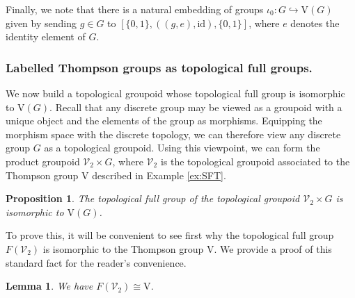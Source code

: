 \documentclass[10pt,a4paper]{amsart}
\numberwithin{equation}{section}
\numberwithin{figure}{section}
\newtheorem{lem}[thm]{Lemma}
\newtheorem{prop}[thm]{Proposition}
\theoremstyle{definition}
\newcommand{\cV}{\mathcal{V}}
\newcommand{\V}{\mathrm{V}}
\begin{document}
Finally, we note that there is a natural embedding of groups $\iota_0 \colon G \hookrightarrow \V(G)$ given by sending $g \in G$ to $[\{0,1\}, ((g,e),\mathrm{id}),\{0,1\}]$, where $e$ denotes the identity element of $G$.


\subsubsection*{Labelled Thompson groups as topological full groups.}

We now build a topological groupoid whose topological full group is isomorphic to $\V(G)$. Recall that any discrete group may be viewed as a groupoid with a unique object and the elements of the group as morphisms. Equipping the morphism space with the discrete topology, we can therefore view any discrete group $G$ as a topological groupoid. Using this viewpoint, we can form the product groupoid $\mathcal{V}_2 \times G$, where $\cV_2$ is the topological groupoid associated to the Thompson group $\V$ described in Example \ref{ex:SFT}.

\begin{prop}
\label{prop:full-group-VH}
The topological full group of the topological groupoid $\mathcal{V}_2 \times G$ is isomorphic to $\V(G)$.
\end{prop}

To prove this, it will be convenient to see first why the topological full group $F(\mathcal{V}_2)$ is isomorphic to the Thompson group $\V$. We provide a proof of this standard fact for the reader's convenience.

\begin{lem}
\label{lem:groupdV2-full-V}
We have $F(\mathcal{V}_2) \cong \V$. 
\end{lem}
\end{document}
